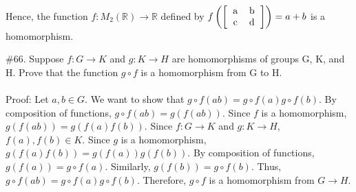 \documentclass[11pt]{amsart}
\begin{document}
\\Hence, the function $f:M_2(\mathbb{R}) \to \mathbb{R}$ defined by $f\left({\left[{ \begin{tabular}{c c}  a & b\\ c & d\end{tabular}}\right]}\right) = a+b$ is a homomorphism.
\\
\vskip 0.2in

\#66. Suppose $f:G \to K$ and $g:K \to H$ are homomorphisms of groups G, K, and H. Prove that the function $g \circ f$ is a homomorphism from G to H.\\
\\Proof: Let $a,b\in G$. We want to show that $g\circ f(ab)=g\circ f(a)g\circ f(b)$. By composition of functions, $g\circ f(ab)=g(f(ab))$. Since $f$ is a homomorphism, $g(f(ab))=g(f(a)f(b))$. Since $f:G\to K$ and $g:K\to H$, $f(a),f(b)\in K$. Since $g$ is a homomorphism, $g(f(a)f(b))=g(f(a))g(f(b))$. By composition of functions, $g(f(a))=g\circ f(a)$. Similarly, $g(f(b))=g\circ f(b)$. Thus, $g\circ f(ab)=g\circ f(a)g\circ f(b)$. Therefore, $g\circ f$ is a homomorphism from $G\to H$.
\end{document}
